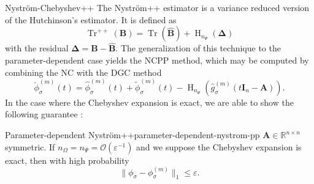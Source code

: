 \documentclass[final, leqno, 12pt]{beamer}
\newcommand{\mtx}[1]{\boldsymbol{#1}}
\DeclareMathOperator{\Tr}{Tr}
\DeclareMathOperator{\Hutch}{H}
\let\oldcite\cite
\renewcommand{\cite}[2][]{\textcolor{linkcolor}{\oldcite{#2}}}
\begin{document}
\begin{frame}[t]
\begin{columns}[t]
    \begin{column}{0.3\paperwidth}

        \begin{block}{Nystr\"om-Chebyshev++}
            The Nystr\"om++ estimator is a variance reduced version
            of the Hutchinson's estimator. It is defined as
            \begin{equation}
                \Tr^{++}(\mtx{B}) = \Tr(\widehat{\mtx{B}}) + \Hutch_{n_{\Psi}}(\mtx{\Delta})
            \end{equation}
            with the residual $\mtx{\Delta} = \mtx{B} - \widehat{\mtx{B}}$.
            The generalization of this technique to the
            parameter-dependent case yields the \gls{NCPP} method, which 
            may be computed by combining the \gls{NC} with the \gls{DGC} method
            \begin{equation}
                \boxed{\breve{\phi}_{\sigma}^{(m)}(t) = \widehat{\phi}_{\sigma}^{(m)}(t) + \widetilde{\phi}_{\sigma}^{(m)}(t) - \Hutch_{n_{\Psi}}(\widehat{g}_{\sigma}^{(m)}(t\mtx{I}_n - \mtx{A})).}
            \end{equation}
        In the case where the Chebyshev expansion is exact,
        we are able to show the following guarantee \cite{he2023parameter}:
        \begin{thm}{Parameter-dependent Nystr\"om++}{parameter-dependent-nystrom-pp}
            $\mtx{A} \in \mathbb{R}^{n \times n}$ symmetric. If $n_{\Omega} = n_{\Psi} = \mathcal{O}\left( \varepsilon^{-1} \right)$
            and we suppose the Chebyshev expansion is exact, then with high probability
            \begin{equation*}
                \lVert \phi_{\sigma} - \phi_{\sigma}^{(m)} \rVert _1 \leq \varepsilon.
            \end{equation*}
        \end{thm}
    \end{block}

    \end{column}


\end{columns}
\end{frame}
\end{document}
